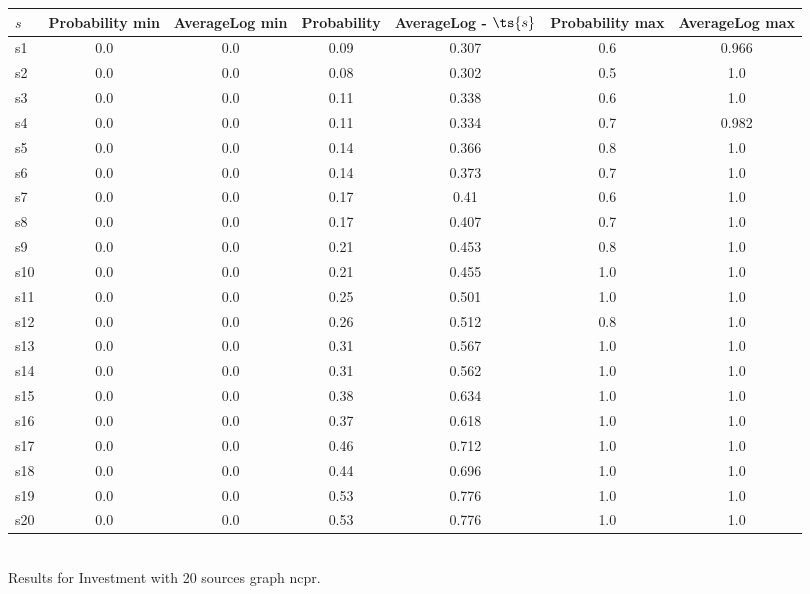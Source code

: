 \documentclass{article}
\begin{document}
\noindent\begin{tabular}{|l|c|c|c|c|c|c|}
\hline
$s$& Probability min & AverageLog min & Probability & AverageLog - $\ts{s}$ & Probability max & AverageLog max\\
\hline
s1 &0.0 & 0.0 & 0.09 & 0.307 & 0.6 & 0.966\\
\hline
s2 &0.0 & 0.0 & 0.08 & 0.302 & 0.5 & 1.0\\
\hline
s3 &0.0 & 0.0 & 0.11 & 0.338 & 0.6 & 1.0\\
\hline
s4 &0.0 & 0.0 & 0.11 & 0.334 & 0.7 & 0.982\\
\hline
s5 &0.0 & 0.0 & 0.14 & 0.366 & 0.8 & 1.0\\
\hline
s6 &0.0 & 0.0 & 0.14 & 0.373 & 0.7 & 1.0\\
\hline
s7 &0.0 & 0.0 & 0.17 & 0.41 & 0.6 & 1.0\\
\hline
s8 &0.0 & 0.0 & 0.17 & 0.407 & 0.7 & 1.0\\
\hline
s9 &0.0 & 0.0 & 0.21 & 0.453 & 0.8 & 1.0\\
\hline
s10 &0.0 & 0.0 & 0.21 & 0.455 & 1.0 & 1.0\\
\hline
s11 &0.0 & 0.0 & 0.25 & 0.501 & 1.0 & 1.0\\
\hline
s12 &0.0 & 0.0 & 0.26 & 0.512 & 0.8 & 1.0\\
\hline
s13 &0.0 & 0.0 & 0.31 & 0.567 & 1.0 & 1.0\\
\hline
s14 &0.0 & 0.0 & 0.31 & 0.562 & 1.0 & 1.0\\
\hline
s15 &0.0 & 0.0 & 0.38 & 0.634 & 1.0 & 1.0\\
\hline
s16 &0.0 & 0.0 & 0.37 & 0.618 & 1.0 & 1.0\\
\hline
s17 &0.0 & 0.0 & 0.46 & 0.712 & 1.0 & 1.0\\
\hline
s18 &0.0 & 0.0 & 0.44 & 0.696 & 1.0 & 1.0\\
\hline
s19 &0.0 & 0.0 & 0.53 & 0.776 & 1.0 & 1.0\\
\hline
s20 &0.0 & 0.0 & 0.53 & 0.776 & 1.0 & 1.0\\
\hline
\end{tabular}\\

\noindent Results for Investment with 20 sources graph ncpr.
\end{document}
